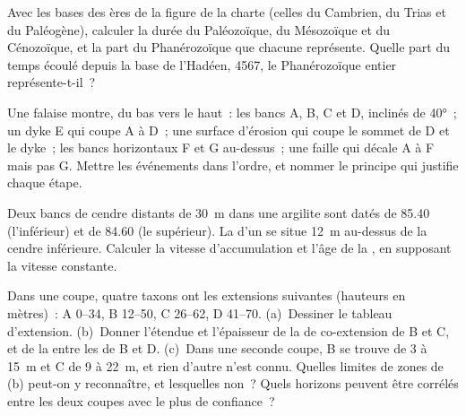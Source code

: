 \begin{exercise}[$\star$]\label{exo:b1:stratigraphic-scale:2}
Avec les bases des ères de la figure de la charte (celles du Cambrien,
du Trias et du Paléogène), calculer la durée
du Paléozoïque, du Mésozoïque et du Cénozoïque, et la part du Phanérozoïque
que chacune représente. Quelle part du temps écoulé depuis la base de l'Hadéen,
\qty{4567}{\Ma}, le Phanérozoïque entier représente-t-il~?
\end{exercise}

\begin{exercise}[$\star$]\label{exo:b1:stratigraphic-scale:3}
Une falaise montre, du bas vers le haut~: les bancs A, B, C et D, inclinés de \ang{40}~; un dyke
E qui coupe A à D~; une surface d'érosion qui coupe le sommet de D et le dyke~;
les bancs horizontaux F et G au-dessus~; une faille qui décale A à F mais pas G. Mettre les
événements dans l'ordre, et nommer le principe qui justifie chaque étape.
\end{exercise}

\begin{exercise}[$\star$]\label{exo:b1:stratigraphic-scale:4}
Deux bancs de cendre distants de \qty{30}{m} dans une argilite sont datés de \qty{85.40}{\Ma} (l'inférieur)
et de \qty{84.60}{\Ma} (le supérieur). La  d'un  se situe
\qty{12}{m} au-dessus de la cendre inférieure. Calculer la vitesse d'accumulation et l'âge de
la , en supposant la vitesse constante.
\end{exercise}

\begin{exercise}[$\star\star$]\label{exo:b1:stratigraphic-scale:5}
Dans une coupe, quatre taxons ont les extensions suivantes (hauteurs en mètres)~: A 0--34, B
12--50, C 26--62, D 41--70. (a)~Dessiner le tableau d'extension. (b)~Donner l'étendue et
l'épaisseur de la  de co-extension de B et C, et de la 
entre les  de B et D. (c)~Dans une seconde coupe, B se trouve
de 3 à 15~m et C de 9 à 22~m, et rien d'autre n'est connu. Quelles limites de zones
de (b) peut-on y reconnaître, et lesquelles non~? Quels horizons peuvent
être corrélés entre les deux coupes avec le plus de confiance~?
\end{exercise}

